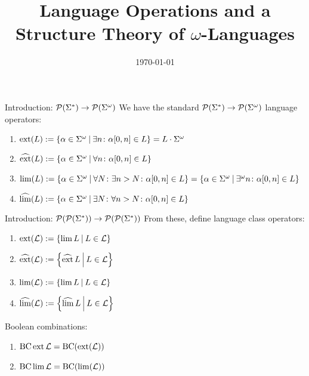 \documentclass[
	handout,
	notheorems,noamsthm]{beamer}
\title[Kurzform]{Language Operations and a Structure Theory of $\omega$-Languages}
\date{\today}
\begin{document}
\frame{\titlepage}


\begin{frame}[<+->]{Introduction: $\mathcal{P}(\Sigma^*) \rightarrow \mathcal{P}(\Sigma^\omega)$}
We have the standard $\mathcal{P}(\Sigma^*) \rightarrow \mathcal{P}(\Sigma^\omega)$ language operators:

\begin{enumerate}
\item $\ext(L) := \Set{\alpha \in \Sigma^\omega}{ \exists n \colon \alpha[0,n] \in L} = L \cdot \Sigma^\omega$
\item $\dext(L) := \Set{\alpha \in \Sigma^\omega}{ \forall n \colon \alpha[0,n] \in L}$
\item $\lim(L) := \Set{ \alpha \in \Sigma^\omega }{ \forall N \colon \exists n > N \colon \alpha[0,n] \in L } = \Set{ \alpha \in \Sigma^\omega }{ \exists^\omega n \colon \alpha[0,n] \in L }$
\item $\dlim(L) := \Set{ \alpha \in \Sigma^\omega }{ \exists N \colon \forall n > N \colon \alpha[0,n] \in L }$
\end{enumerate}
\end{frame}

\begin{frame}[<+->]{Introduction: $\mathcal{P}(\mathcal{P}(\Sigma^*)) \rightarrow \mathcal{P}(\mathcal{P}(\Sigma^*))$}
From these, define language class operators:

\begin{enumerate}
\item $\ext(\Lang) := \Set{\lim L}{L \in \Lang}$
\item $\dext(\Lang) := \Set{\dext L}{L \in \Lang}$
\item $\lim(\Lang) := \Set{\lim L}{L \in \Lang}$
\item $\dlim(\Lang) := \Set{\dlim L}{L \in \Lang}$
\end{enumerate}

Boolean combinations:
\begin{enumerate}
\item $\operatorname{BC} \operatorname{ext} \mathcal{L} = \operatorname{BC} (\operatorname{ext} (\mathcal{L}))$
\item $\operatorname{BC} \lim \mathcal{L} = \operatorname{BC} (\lim (\mathcal{L}))$
\end{enumerate}


\end{frame}
\end{document}
